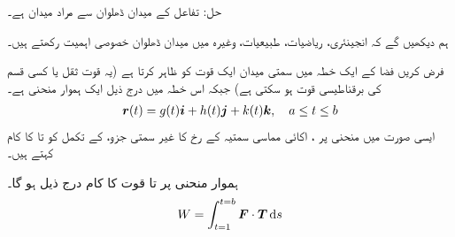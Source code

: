 حل:\quad
تفاعل  کے میدان ڈھلوان سے مراد میدان  ہے۔

 ہم  دیکھیں گے کہ انجینئری، ریاضیات، طبیعیات، وغیرہ میں میدان ڈھلوان  خصوصی اہمیت رکھتے ہیں۔

فرض کریں  فضا کے ایک خطہ  میں سمتی میدان   ایک قوت کو ظاہر کرتا ہے (یہ قوت ثقل  یا کسی قسم کی برقناطیسی قوت ہو سکتی ہے) جبکہ اس خطہ میں درج ذیل ایک ہموار منحنی ہے۔
\begin{align*}
{\ensuremath{{\boldsymbol{r}}}}(t)=g(t){\boldsymbol{i}}+h(t){\boldsymbol{j}}+k(t){\boldsymbol{k}},\quad a\le t\le b
\end{align*}
ایسی صورت میں منحنی پر ،  اکائی مماسی سمتیہ کے رخ  کا غیر سمتی جزو، کے تکمل کو  تا   کا کام کہتے ہیں۔

ہموار منحنی  پر  تا  قوت
  کا کام  درج ذیل ہو گا۔
\begin{align}\label{مساوات_سمتی_میدان_کام_کی_تعریف}
W=\int_{t=1}^{t=b}\kvec{F}\cdot \kvec{T}\dif s
\end{align}

